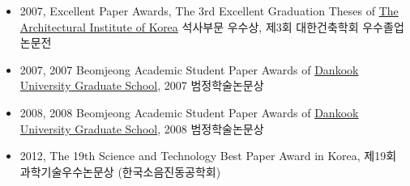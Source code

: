 \nocite{*}
\begin{itemize}[label=]
  \item 2007, Excellent Paper Awards, The 3rd Excellent Graduation Theses of \href{http://www.aik.or.kr}{The Architectural Institute of Korea} 석사부문 우수상, 제3회 대한건축학회 우수졸업논문전
  \item 2007, 2007 Beomjeong Academic Student Paper Awards of \href{http://cms.dankook.ac.kr/web/grad}{Dankook University Graduate School}, 2007 범정학술논문상
  \item 2008, 2008 Beomjeong Academic Student Paper Awards of \href{http://cms.dankook.ac.kr/web/grad}{Dankook University Graduate School}, 2008 범정학술논문상
  \item 2012, The 19th Science and Technology Best Paper Award in Korea, 제19회 과학기술우수논문상 (한국소음진동공학회)
\end{itemize}